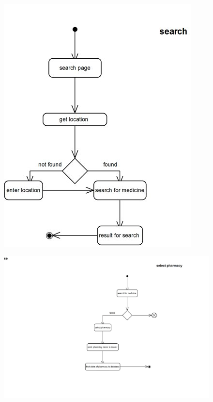 \documentclass[]{article}
\begin{document}
\begin{figure}[H]
\centering
\includegraphics[scale=0.7]{./activity/04}
\end{figure}
\begin{figure}[H]
\centering
\includegraphics[scale=0.4]{./activity/05}
\end{figure}
\end{document}
